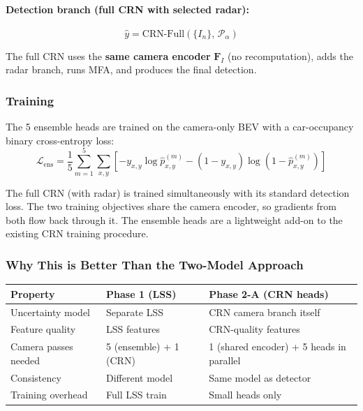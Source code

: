 \documentclass[12pt, a4paper]{article}
\newcommand{\FI}{\mathbf{F}_{I}}
\theoremstyle{definition}
\begin{document}
\paragraph{Detection branch (full CRN with selected radar):}
\begin{equation}
  \hat{y} = \mathrm{CRN\text{-}Full}\!\left(\{I_n\},\, \mathcal{P}_\alpha\right)
  \label{eq:full_crn_detect}
\end{equation}

The full CRN uses the \textbf{same camera encoder} $\FI$ (no recomputation),
adds the radar branch, runs MFA, and produces the final detection.

\subsubsection{Training}

The 5 ensemble heads are trained on the camera-only BEV with a car-occupancy
binary cross-entropy loss:
\begin{equation}
  \mathcal{L}_{\mathrm{ens}}
  = \frac{1}{5}\sum_{m=1}^{5}
    \sum_{x,y}\left[
      -y_{x,y}\log\hat{p}^{(m)}_{x,y}
      - (1-y_{x,y})\log(1-\hat{p}^{(m)}_{x,y})
    \right]
  \label{eq:ens_loss}
\end{equation}

The full CRN (with radar) is trained simultaneously with its standard detection
loss. The two training objectives share the camera encoder, so gradients from
both flow back through it. The ensemble heads are a lightweight add-on to the
existing CRN training procedure.

\subsubsection{Why This is Better Than the Two-Model Approach}

\begin{center}
\renewcommand{\arraystretch}{1.3}
\begin{tabular}{lll}
  \toprule
  \textbf{Property} & \textbf{Phase 1 (LSS)} & \textbf{Phase 2-A (CRN heads)} \\
  \midrule
  Uncertainty model & Separate LSS & CRN camera branch itself \\
  Feature quality & LSS features & CRN-quality features \\
  Camera passes needed & 5 (ensemble) + 1 (CRN) & 1 (shared encoder) + 5 heads in parallel \\
  Consistency & Different model & Same model as detector \\
  Training overhead & Full LSS train & Small heads only \\
  \bottomrule
\end{tabular}
\end{center}
\end{document}
